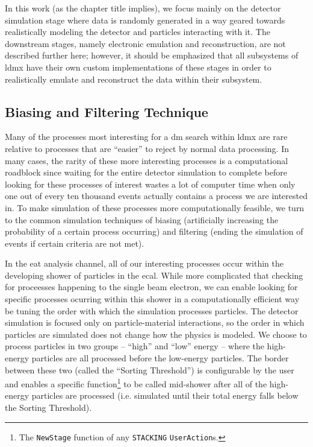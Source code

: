 In this work (as the chapter title implies), we focus mainly on the detector simulation stage where
data is randomly generated in a way geared towards
realistically modeling the detector and particles interacting with it. The downstream stages,
namely electronic emulation and reconstruction, are not described further here; however, it should
be emphasized that all subsystems of \ac{ldmx} have their own custom implementations of these
stages in order to realistically emulate and reconstruct the data within their subsystem.

\subsection{Biasing and Filtering Technique}
Many of the processes most interesting for a \ac{dm} search within \ac{ldmx} are rare relative to
processes that are ``easier'' to reject by normal data processing.
In many cases, the rarity of these more interesting processes is a computational roadblock
since waiting for the entire detector simulation to complete before looking for these processes
of interest wastes a lot of computer time when only one out of every ten thousand events actually
contains a process we are interested in.
To make simulation of these processes more computationally feasible, we turn to the common simulation
techniques of biasing (artificially increasing the probability of a certain process occurring) and
filtering (ending the simulation of events if certain criteria are not met).

In the \ac{eat} analysis channel, all of our interesting processes occur within the developing
shower of particles in the \ac{ecal}.
While more complicated that checking for proceesses happening to the single beam electron,
we can enable looking for specific processes ocurring within this shower in a computationally
efficient way be tuning the order with which the simulation processes particles.
The detector simulation is focused only on particle-material interactions, so the order 
in which particles are simulated does not change how the physics is modeled.
We choose to process particles in two groups -- ``high'' and ``low'' energy --
where the high-energy particles are all processed before the low-energy particles.
The border between these two (called the ``Sorting Threshold'') is configurable by the user and enables a specific function\footnote{
The \texttt{NewStage} function of any \texttt{STACKING} \texttt{UserAction}s. 
} to be called mid-shower after all of the high-energy particles are processed
(i.e. simulated until their total energy falls below the Sorting Threshold).

